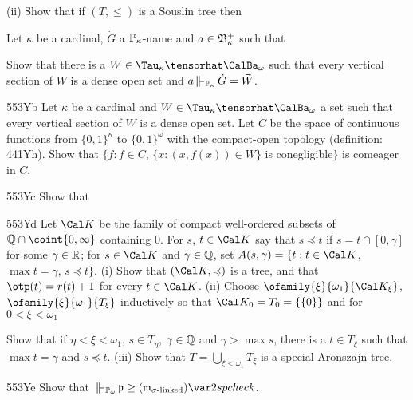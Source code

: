 {\noindent (ii) Show that if $(T,\le)$ is a Souslin tree then


Let $\kappa$ be a cardinal, $\dot G$ a $\Bbb P_{\kappa}$-name and
$a\in\frak B_{\kappa}^+$ such that


\noindent Show that there is a
$W\in\Tau_{\kappa}\tensorhat\CalBa_{\omega}$ such that every vertical
section of $W$ is a dense open set and $a\VVdPk\,\dot G=\vec W$.

\spheader 553Yb Let $\kappa$ be a cardinal and
$W\in\Tau_{\kappa}\tensorhat\CalBa_{\omega}$ a set such that every
vertical section of $W$ is a dense open set.   Let $C$ be the space of
continuous functions from $\{0,1\}^{\kappa}$ to $\{0,1\}^{\omega}$ with the
compact-open topology (definition:  441Yh).   Show that
$\{f:f\in C$, $\{x:(x,f(x))\in W\}$ is conegligible$\}$ is comeager in $C$.

\spheader 553Yc Show that


\noindent{}

\spheader 553Yd Let $\Cal K$ be the family of compact well-ordered subsets
of $\Bbb Q\cap\coint{0,\infty}$ containing $0$.
For $s$, $t\in\Cal K$ say that
$s\preccurlyeq t$ if $s=t\cap[0,\gamma]$ for some $\gamma\in\Bbb R$;  for
$s\in\Cal K$ and $\gamma\in\Bbb Q$, set
$A(s,\gamma)=\{t:t\in\Cal K$, $\max t=\gamma$, $s\preccurlyeq t\}$.
(i) Show that $(\Cal K,\preccurlyeq)$ is a tree, and that $\otp(t)=r(t)+1$ for
every $t\in\Cal K$.
(ii) Choose $\ofamily{\xi}{\omega_1}{\Cal K_{\xi}}$,
$\ofamily{\xi}{\omega_1}{T_{\xi}}$ inductively so that
$\Cal K_0=T_0=\{\{0\}\}$ and for $0<\xi<\omega_1$


\noindent Show that if $\eta<\xi<\omega_1$, $s\in T_{\eta}$,
$\gamma\in\Bbb Q$ and $\gamma>\max s$, there is a $t\in T_{\xi}$ such that
$\max t=\gamma$ and $s\preccurlyeq t$.
(iii) Show that $T=\bigcup_{\xi<\omega_1}T_{\xi}$ is a
special Aronszajn tree.

\spheader 553Ye Show that
$\VVdash_{\Bbb P_{\omega}}\,
\frak p\ge(\frak m_{\sigma\text{-linked}})\var2spcheck$.
}%

